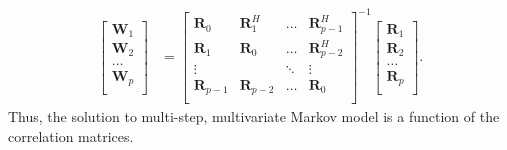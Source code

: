 \begin{align}
  \begin{bmatrix}
    \mathbf W_{1} \\ \mathbf W_{2} \\ \dots \\ \mathbf W_{p} \\
  \end{bmatrix}
  &= 
  \begin{bmatrix}
    \mathbf R_{0} & \mathbf R_1^H & \dots  & \mathbf R_{p-1}^H \\
    \mathbf R_{1} & \mathbf R_0   & \dots  & \mathbf R_{p-2}^H \\
    \vdots      &         & \ddots & \vdots \\
    \mathbf R_{p-1} & \mathbf R_{p-2}   & \dots  & \mathbf R_{0} \\
  \end{bmatrix}^{-1}
  \begin{bmatrix}
    \mathbf R_{1} \\ \mathbf R_{2} \\ \dots \\ \mathbf R_{p} \\
  \end{bmatrix}. \label{eq:toep-sol}
\end{align}
Thus, the solution to multi-step, multivariate Markov model is a function of the correlation matrices.
